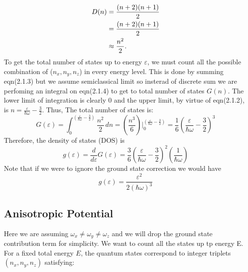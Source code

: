 \documentclass{article}
\numberwithin{equation}{section}
\numberwithin{equation}{subsection}
\begin{document}
\begin{align}
    D(n) &= \frac{(n+2)(n+1)}{2} \notag \\
         &= \frac{(n+2)(n+1)}{2} \notag \\
         &\approx \frac{n^2}{2}.
\end{align}
To get the total number of states up to energy $\varepsilon$, we must count all the possible combination of ($\mathit{n}_{\mathit{x}}, \mathit{n}_{\mathit{y}}, \mathit{n}_{\mathit{z}}$) in every energy level. This is done by summing eqn(2.1.3) but we assume semiclassical limit so insterad of discrete sum we are perfoming an integral on eqn(2.1.4) to get to total number of states $G(n)$. The lower limit of integration is clearly 0 and the upper limit, by virtue of eqn(2.1.2), is $\mathit{n} = \frac{\varepsilon}{\hbar\omega}-\frac{3}{2} $. Thus, The total number of states is:
\begin{equation}
    G(\mathit{\varepsilon}) = \int_{0}^{(\frac{\varepsilon}{\hbar\omega}-\frac{3}{2})} \frac{\mathit{n}^2}{2} \,d\mathit{n} = \left(\frac{\mathit{n}^3}{6}\right)\bigg|_{0}^{(\frac{\varepsilon}{\hbar\omega}-\frac{3}{2})} = \frac{1}{6}\left(\frac{\varepsilon}{\hbar\omega}-\frac{3}{2}\right)^3
\end{equation}
Therefore, the density of states (DOS) is 
\begin{equation}
    g(\mathit{\varepsilon}) = \frac{d}{d \varepsilon}G(\mathit{\varepsilon}) = \frac{3}{6}\left(\frac{\varepsilon}{\hbar\omega}-\frac{3}{2}\right)^2\left(\frac{1}{\hbar \omega}\right)
\end{equation}
Note that if we were to ignore the ground state correction we would have
\begin{equation}
    g(\mathit{\varepsilon}) = \frac{\varepsilon^2}{2(\hbar\omega)^3}
\end{equation}

\subsection{Anisotropic Potential}
Here we are assuming $\omega_{\mathit{x}} \neq \omega_{\mathit{y}} \neq \omega_{\mathit{z}}$ and we will drop the ground state contribution term for simplicity. We want to count all the states up tp energy E. For a fixed total energy \(E\), the quantum states correspond to integer triplets \((\mathit{n}_{\mathit{x}},\mathit{n}_{\mathit{y}},\mathit{n}_{\mathit{z}})\) satisfying:
\end{document}

